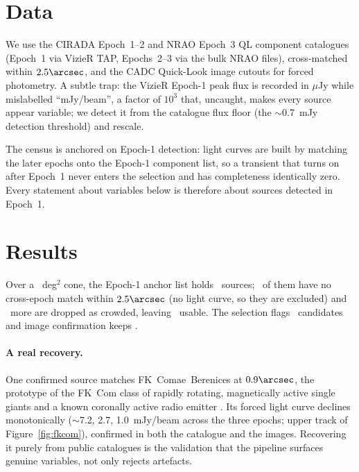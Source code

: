 \documentclass[twocolumn]{aastex631}
\begin{document}
\section{Data}
We use the CIRADA Epoch~1--2 and NRAO Epoch~3 QL component catalogues \citep{gordon2021,vlassmemo22}
(Epoch~1 via VizieR TAP, Epochs~2--3 via the bulk NRAO files), cross-matched within $2.5\arcsec$, and
the CADC Quick-Look image cutouts for forced photometry. A subtle trap: the VizieR Epoch-1 peak flux
is recorded in $\mu$Jy while mislabelled ``mJy/beam'', a factor of $10^3$ that, uncaught, makes
every source appear variable; we detect it from the catalogue flux floor (the $\sim$0.7~mJy detection
threshold) and rescale.

The census is anchored on Epoch-1 detection: light curves are built by matching the later epochs
onto the Epoch-1 component list, so a transient that turns on after Epoch~1 never enters the
selection and has completeness identically zero. Every statement about variables below is therefore
about sources detected in Epoch~1.

\section{Results}
\label{sec:results}
Over a \vlassRealArea~deg$^2$ cone, the Epoch-1 anchor list holds \vlassRealNsources\ sources;
\vlassRealNsingleEpoch\ of them have no cross-epoch match within $2.5\arcsec$ (no light curve, so
they are excluded) and \vlassRealNexcluded\ more are dropped as crowded, leaving \vlassRealNusable\
usable. The selection flags \vlassRealNcand\ candidates and image confirmation keeps
\vlassRealNconfirmed.

\paragraph{A real recovery.} One confirmed source matches FK~Comae~Berenices at $0.9\arcsec$,
the prototype of the FK~Com class of rapidly rotating, magnetically active single giants and a known
coronally active radio emitter \citep{gudel2002}. Its forced light curve declines monotonically
($\sim$7.2, 2.7, 1.0~mJy/beam across the three epochs; upper track of Figure~\ref{fig:fkcom}),
confirmed in both the catalogue and the images. Recovering it purely from public catalogues is the
validation that the pipeline surfaces genuine variables, not only rejects artefacts.
\end{document}

